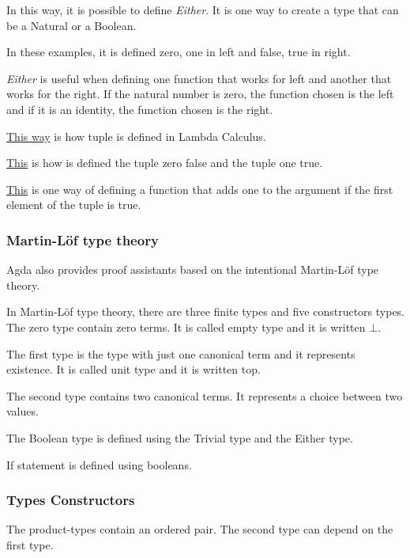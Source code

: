   In this way, it is possible to define \emph{Either}.
  It is one way to create a type that can be a Natural or a Boolean.

  In these examples, it is defined zero, one in left and false, true in right.

  \emph{Either} is useful when defining one function that works for left and another that works for the right.
  If the natural number is zero, the function chosen is the left and
  if it is an identity, the function chosen is the right. 

  \hyperref[tuple]{This way} is how tuple is defined in Lambda Calculus.

  \hyperref[tupleexamples]{This} is how is defined the tuple zero false and the tuple one true.

  \hyperref[tupleadd]{This} is one way of defining a function that adds one to the argument
  if the first element of the tuple is true.


  \subsubsection{Martin-Löf type theory}
  Agda also provides proof assistants based on the intentional Martin-Löf type theory.

    In Martin-Löf type theory, there are three finite types and five constructors types.
    The zero type contain zero terms. It is called empty type and it is written $\bot$.

    The first type is the type with just one canonical term and it represents existence.
    It is called unit type and it is written top.

    The second type contains two canonical terms. It represents a choice between two values.

    The Boolean type is defined using the Trivial type and the Either type.

    If statement is defined using booleans.


    \subsubsection{Types Constructors}
    The product-types contain an ordered pair.
    The second type can depend on the first type.

